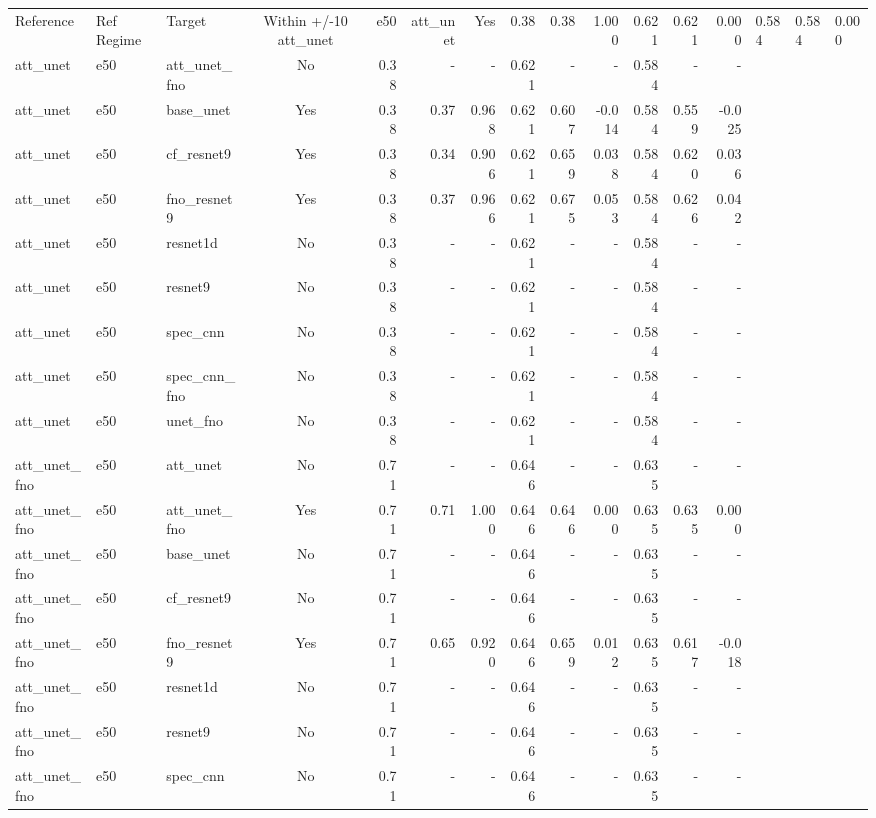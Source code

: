 \begin{tabular}{l l l c r r r r r r r r r}
\toprule
Reference & Ref Regime & Target & Within +/-10%
\midrule
att_unet & e50 & att_unet & Yes & 0.38 & 0.38 & 1.000 & 0.621 & 0.621 & 0.000 & 0.584 & 0.584 & 0.000 \\
att_unet & e50 & att_unet_fno & No & 0.38 & - & - & 0.621 & - & - & 0.584 & - & - \\
att_unet & e50 & base_unet & Yes & 0.38 & 0.37 & 0.968 & 0.621 & 0.607 & -0.014 & 0.584 & 0.559 & -0.025 \\
att_unet & e50 & cf_resnet9 & Yes & 0.38 & 0.34 & 0.906 & 0.621 & 0.659 & 0.038 & 0.584 & 0.620 & 0.036 \\
att_unet & e50 & fno_resnet9 & Yes & 0.38 & 0.37 & 0.966 & 0.621 & 0.675 & 0.053 & 0.584 & 0.626 & 0.042 \\
att_unet & e50 & resnet1d & No & 0.38 & - & - & 0.621 & - & - & 0.584 & - & - \\
att_unet & e50 & resnet9 & No & 0.38 & - & - & 0.621 & - & - & 0.584 & - & - \\
att_unet & e50 & spec_cnn & No & 0.38 & - & - & 0.621 & - & - & 0.584 & - & - \\
att_unet & e50 & spec_cnn_fno & No & 0.38 & - & - & 0.621 & - & - & 0.584 & - & - \\
att_unet & e50 & unet_fno & No & 0.38 & - & - & 0.621 & - & - & 0.584 & - & - \\
att_unet_fno & e50 & att_unet & No & 0.71 & - & - & 0.646 & - & - & 0.635 & - & - \\
att_unet_fno & e50 & att_unet_fno & Yes & 0.71 & 0.71 & 1.000 & 0.646 & 0.646 & 0.000 & 0.635 & 0.635 & 0.000 \\
att_unet_fno & e50 & base_unet & No & 0.71 & - & - & 0.646 & - & - & 0.635 & - & - \\
att_unet_fno & e50 & cf_resnet9 & No & 0.71 & - & - & 0.646 & - & - & 0.635 & - & - \\
att_unet_fno & e50 & fno_resnet9 & Yes & 0.71 & 0.65 & 0.920 & 0.646 & 0.659 & 0.012 & 0.635 & 0.617 & -0.018 \\
att_unet_fno & e50 & resnet1d & No & 0.71 & - & - & 0.646 & - & - & 0.635 & - & - \\
att_unet_fno & e50 & resnet9 & No & 0.71 & - & - & 0.646 & - & - & 0.635 & - & - \\
att_unet_fno & e50 & spec_cnn & No & 0.71 & - & - & 0.646 & - & - & 0.635 & - & - \\

\end{tabular}
